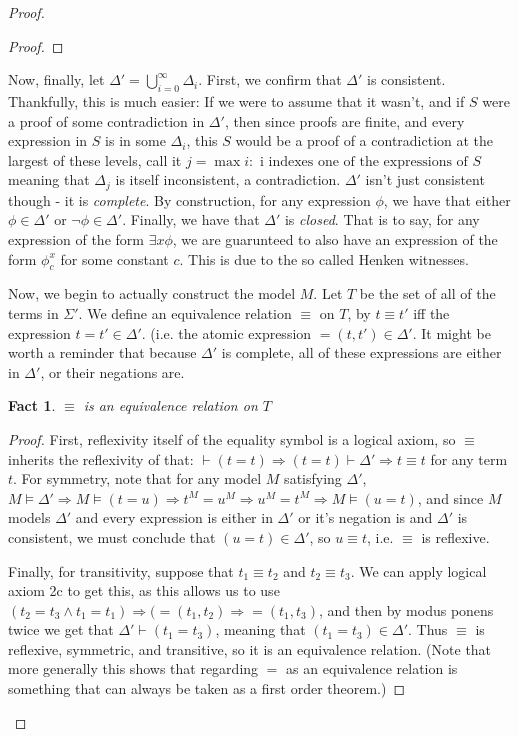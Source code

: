 \documentclass{article}
\theoremstyle{definition}
\theoremstyle{plain}
\theoremstyle{theorem}
\newtheorem{fact}{Fact}[section]
\begin{document}
\begin{proof}
\begin{proof}
    \end{proof}
    Now, finally, let $\Delta' = \bigcup_{i=0}^{\infty}\Delta_i$. First, we confirm that $\Delta'$ is consistent. Thankfully, this is much easier: If we were to assume that it wasn't, and if $S$ were a proof of some contradiction in $\Delta'$, then since proofs are finite, and every expression in $S$ is in some $\Delta_i$, this $S$ would be a proof of a contradiction at the largest of these levels, call it $j = \max{i: \textrm{ i indexes one of the expressions of $S$}}$ meaning that $\Delta_j$ is itself inconsistent, a contradiction. $\Delta'$ isn't just consistent though - it is \textit{complete}. By construction, for any expression $\phi$, we have that either $\phi \in \Delta'$ or $\neg \phi \in \Delta'$. Finally, we have that $\Delta'$ is \textit{closed}. That is to say, for any expression of the form $\exists x \phi$, we are guarunteed to also have an expression of the form $\phi_c^x$ for some constant $c$. This is due to the so called Henken witnesses.
    \par Now, we begin to actually construct the model $M$. Let $T$ be the set of all of the terms in $\Sigma'$. We define an equivalence relation $\equiv$ on $T$, by $t \equiv t'$ iff the expression $t = t' \in \Delta'$. (i.e. the atomic expression $=(t,t') \in \Delta'$. It might be worth a reminder that because $\Delta'$ is complete, all of these expressions are either in $\Delta'$, or their negations are.
    \begin{fact}
        $\equiv$ is an equivalence relation on $T$
    \end{fact}
    \begin{proof}
        First, reflexivity itself of the equality symbol is a logical axiom, so $\equiv$ inherits the reflexivity of that: $\vdash (t = t) \Rightarrow (t = t) \vdash \Delta' \Rightarrow t \equiv t$ for any term $t$.
        For symmetry, note that for any model $M$ satisfying $\Delta'$, $M \models \Delta' \Rightarrow M \models (t = u) \Rightarrow t^M = u^M \Rightarrow u^M = t^M \Rightarrow M \models (u = t)$, and since $M$ models $\Delta'$ and every expression is either in $\Delta'$ or it's negation is and $\Delta'$ is consistent, we must conclude that $(u = t) \in \Delta'$, so $u \equiv t$, i.e. $\equiv$ is reflexive.
        \par Finally, for transitivity, suppose that $t_1 \equiv t_2$ and $t_2 \equiv t_3$. We can apply logical axiom 2c to get this, as this allows us to use $(t_2 = t_3 \wedge t_1 = t_1) \Rightarrow (=(t_1,t_2) \Rightarrow =(t_1,t_3)$, and then by modus ponens twice we get that $\Delta' \vdash (t_1 = t_3)$, meaning that $(t_1 = t_3) \in \Delta'$. Thus $\equiv$ is reflexive, symmetric, and transitive, so it is an equivalence relation. (Note that more generally this shows that regarding $=$ as an equivalence relation is something that can always be taken as a first order theorem.)

\end{proof}
\end{proof}
\end{document}
